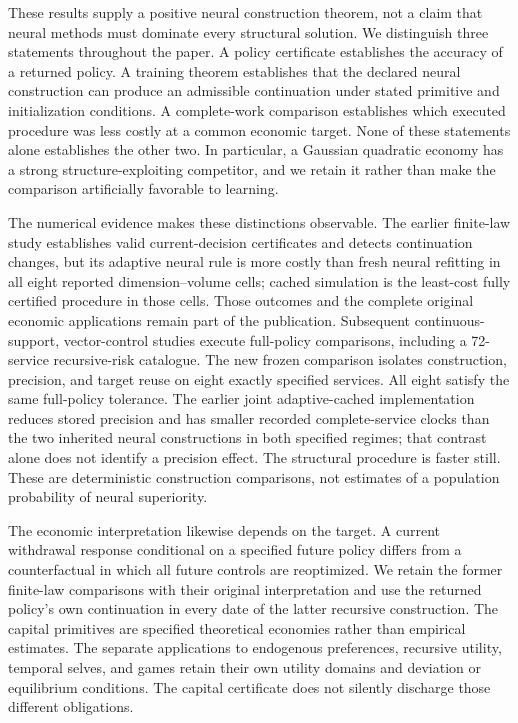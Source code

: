 \documentclass[ecta,nameyear,draft]{econsocart}
\theoremstyle{definition}
\theoremstyle{remark}
\begin{document}
These results supply a positive neural construction theorem, not a claim
that neural methods must dominate every structural solution. We distinguish
three statements throughout the paper. A policy certificate establishes the
accuracy of a returned policy. A training theorem establishes that the declared
neural construction can produce an admissible continuation under stated
primitive and initialization conditions. A complete-work comparison establishes
which executed procedure was less costly at a common economic target. None
of these statements alone establishes the other two. In particular, a Gaussian
quadratic economy has a strong structure-exploiting competitor, and we retain
it rather than make the comparison artificially favorable to learning.

The numerical evidence makes these distinctions observable. The earlier
finite-law study establishes valid current-decision certificates and detects
continuation changes, but its adaptive neural rule is more costly than fresh
neural refitting in all eight reported dimension--volume cells; cached
simulation is the least-cost fully certified procedure in those cells. Those
outcomes and the complete original economic applications remain part of the
publication. Subsequent continuous-support, vector-control studies execute
full-policy comparisons, including a 72-service recursive-risk catalogue.
The new frozen comparison isolates construction, precision, and target reuse
on eight exactly specified services. All eight satisfy the same full-policy
tolerance. The earlier joint adaptive-cached implementation reduces stored precision and has smaller recorded complete-service clocks than the two inherited neural constructions in both specified regimes; that contrast alone does not identify a precision effect. The structural procedure is faster still.
These are deterministic construction comparisons, not estimates of a
population probability of neural superiority.

The economic interpretation likewise depends on the target. A current
withdrawal response conditional on a specified future policy differs from
a counterfactual in which all future controls are reoptimized. We retain
the former finite-law comparisons with their original interpretation and
use the returned policy's own continuation in every date of the latter
recursive construction. The capital primitives are specified theoretical
economies rather than empirical estimates. The separate applications to
endogenous preferences, recursive utility, temporal selves, and games retain
their own utility domains and deviation or equilibrium conditions. The
capital certificate does not silently discharge those different obligations.
\end{document}
